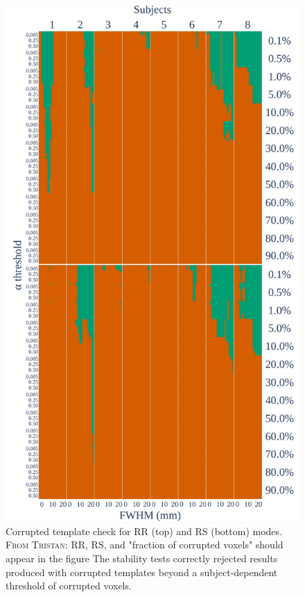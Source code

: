 \documentclass[lettersize,journal]{IEEEtran}
\newcommand{\TG}[1]{\color{orange}\textsc{From Tristan:} #1\color{black}\xspace}
\begin{document}
\begin{figure}
  \centering
  \includegraphics[width=\linewidth]{figures/template/template_fwe_bonferroni.pdf}
  \caption{Corrupted template check for RR (top) and RS (bottom) modes. \TG{RR, RS, and "fraction of corrupted voxels" should appear in the figure} The stability tests correctly rejected results produced with corrupted templates beyond a subject-dependent threshold of corrupted voxels.}
  \label{fig:template_bonferroni}
\end{figure}
\end{document}

